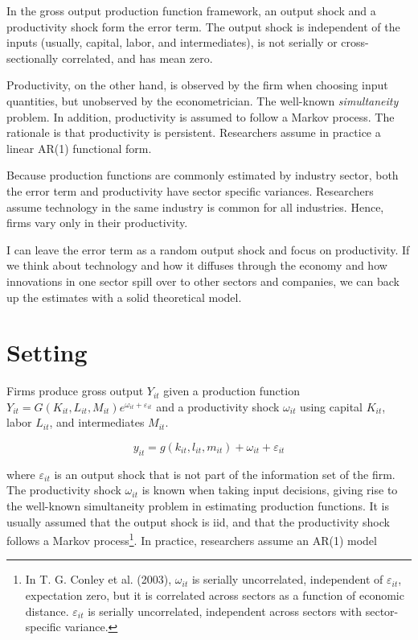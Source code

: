 \documentclass[
]{article}
\begin{document}
In the gross output production function framework, an output shock and a
productivity shock form the error term. The output shock is independent
of the inputs (usually, capital, labor, and intermediates), is not
serially or cross-sectionally correlated, and has mean zero.

Productivity, on the other hand, is observed by the firm when choosing
input quantities, but unobserved by the econometrician. The well-known
\emph{simultaneity} problem. In addition, productivity is assumed to
follow a Markov process. The rationale is that productivity is
persistent. Researchers assume in practice a linear AR(1) functional
form.

Because production functions are commonly estimated by industry sector,
both the error term and productivity have sector specific variances.
Researchers assume technology in the same industry is common for all
industries. Hence, firms vary only in their productivity.

I can leave the error term as a random output shock and focus on
productivity. If we think about technology and how it diffuses through
the economy and how innovations in one sector spill over to other
sectors and companies, we can back up the estimates with a solid
theoretical model.

\hypertarget{setting}{%
\section{Setting}\label{setting}}

Firms produce gross output \(Y_{it}\) given a production function
\(Y_{it}=G(K_{it},L_{it},M_{it})e^{\omega_{it}+\varepsilon_{it}}\) and a
productivity shock \(\omega_{it}\) using capital \(K_{it}\), labor
\(L_{it}\), and intermediates \(M_{it}\).

\[
y_{it}=g(k_{it},l_{it},m_{it})+\omega_{it}+\varepsilon_{it}
\]

where \(\varepsilon_{it}\) is an output shock that is not part of the
information set of the firm. The productivity shock \(\omega_{it}\) is
known when taking input decisions, giving rise to the well-known
simultaneity problem in estimating production functions. It is usually
assumed that the output shock is iid, and that the productivity shock
follows a Markov process\footnote{In T. G. Conley et al. (2003),
  \(\omega_{it}\) is serially uncorrelated, independent of
  \(\varepsilon_{it}\), expectation zero, but it is correlated across
  sectors as a function of economic distance. \(\varepsilon_{it}\) is
  serially uncorrelated, independent across sectors with sector-specific
  variance.}. In practice, researchers assume an AR(1) model
\end{document}
